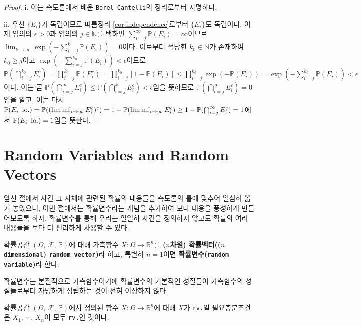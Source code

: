 \begin{proof}
    i. 이는 측도론에서 배운 \texttt{Borel-Cantelli}의 정리로부터 자명하다.

    ii. 우선 $\{E_i\}$가 독립이므로 따름정리 \ref{cor:independence}로부터 $\{E_i^c\}$도 독립이다. 이제 임의의 $\epsilon>0$과 임의의 $j\in\mathbb{N}$를 택하면 $\sum_{i=j}^\infty\mathbb{P}(E_i)=\infty$이므로 $\lim_{k\to\infty}\exp(-\sum_{i=j}^k\mathbb{P}(E_i))=0$이다. 이로부터 적당한 $k_0\in\mathbb{N}$가 존재하여 $k_0\geq j$이고 $\exp(-\sum_{i=j}^{k_0}\mathbb{P}(E_i))<\epsilon$이므로 $\mathbb{P}(\bigcap_{i=j}^{k_0}E_i^c)=\prod_{i=j}^{k_0}\mathbb{P}(E_i^c)=\prod_{i=j}^{k_0}[1-\mathbb{P}(E_i)]\leq\prod_{i=j}^{k_0}\exp(-\mathbb{P}(E_i))=\exp(-\sum_{i=j}^{k_0}\mathbb{P}(E_i))<\epsilon$이다. 이는 곧 $\mathbb{P}(\bigcap_{i=j}^\infty E_i^c)\leq\mathbb{P}(\bigcap_{i=j}^{k_0}E_i^c)<\epsilon$임을 뜻하므로 $\mathbb{P}(\bigcap_{i=j}^\infty E_i^c)=0$임을 알고, 이는 다시 $\mathbb{P}(E_i\,\,\,\mathrm{io.})=\mathbb{P}((\liminf_{i\to\infty} E_i^c)^c)=1-\mathbb{P}(\liminf_{i\to\infty} E_i^c)\geq1-\mathbb{P}(\bigcap_{i=j}^\infty E_i^c)=1$에서 $\mathbb{P}(E_i\,\,\,\mathrm{io.})=1$임을 뜻한다.
\end{proof}

\section{Random Variables and Random Vectors}

앞선 절에서 사건 그 자체에 관련된 확률의 내용들을 측도론의 틀에 맞추어 열심히 옮겨 놓았으니, 이번 절에서는 확률변수라는 개념을 추가하여 보다 내용을 풍성하게 만들어보도록 하자. 확률변수를 통해 우리는 일일히 사건을 정의하지 않고도 확률의 여러 내용들을 보다 더 편리하게 사용할 수 있다.

\begin{definition}
    확률공간 $(\Omega,\,\mathcal{F},\,\mathbb{P})$에 대해 가측함수 $X:\Omega\to\mathbb{R}^n$를 \textbf{($n$차원) 확률벡터(($n$ \texttt{dimensional}) \texttt{random vector})}라 하고, 특별히 $n=1$이면 \textbf{확률변수(\texttt{random variable})}라 한다.
\end{definition}

확률변수는 본질적으로 가측함수이기에 확률변수의 기본적인 성질들이 가측함수의 성질들로부터 자명하게 성립하는 것이 전혀 이상하지 않다.

\begin{proposition}
    확률공간 $(\Omega,\,\mathcal{F},\,\mathbb{P})$에서 정의된 함수 $X:\Omega\to\mathbb{R}^n$에 대해 $X$가 \texttt{rv.}일 필요충분조건은 $X_1,\,\cdots,\,X_n$이 모두 \texttt{rv.}인 것이다.
\end{proposition}

